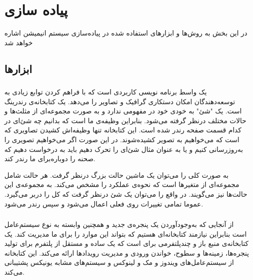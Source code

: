 \chapter { پیاده سازی }

در این بخش به روش‌ها و ابزارهای استفاده شده در پیاده‌سازی سیستم انیمیشن اشاره خواهد شد

\section {ابزارها}

\subsection {
    }

یک واسط برنامه نویسی کاربردی  
است که با فراهم کردن توابع زیادی به توسعه‌دهندگان امکان دستکاری گرافیک و تصاویر را می‌دهد.
یک کتابخانه‌ی رندرینگ است.
یک "شئ" به خودی خود در
مفهومی ندارد
و به صورت مجموعه‌ای از مثلث‌ها و حالات مختلف درنظر گرفته می‌شود. بنابراین  
وظیفه‌ی ما است که بدانیم چه شئ‌ای در کدام قسمت صفحه رندر شده است. این کتابخانه تنها وظیفه‌اش کشیدن تصاویری که است که می‌خواهیم به تصویر کشیده‌شوند.
در این صورت اگر می‌خواهیم تصویری را به‌روزرسانی کنیم و یا به عنوان مثال شئ‌ای را تحرک دهیم باید به 
درخواست دهیم که صحنه را دوباره‌برای ما رندر کند.
\cite{KhronosUsingOpenGL}

به صورت کلی 
را می‌توان یک ماشین حالت بزرگ درنظر گرفت. هر حالت شامل مجموعه‌ای از متغیر‌ها است که نحوه‌ی عملکرد
را مشخص می‌کند. 
به مجموعه‌ی این حالت‌ها 
نیز می‌گویند. 
در واقع  
را می‌توان یک شئ درنظر گرفت که کل
را دربر می‌گیرد. عموما تمامی تغییرات روی 
فعلی اعمال می‌شود و سپس رندر می‌شود.
\cite{KhronosUsingOpenGL} \cite{LearnOpenGL_GettingStarted}


\subsection{}

از آنجایی که به‌وجود‌آوردن یک پنجره‌ی جدید و همچنین 
وابسته به نوع سیستم‌عامل است بنابراین نیازمند کتابخانه‌ای هستیم که بتواند این موارد را برای ما مدیریت کند.
یک کتابخانه‌ی منبع باز و چندپلتفرمی برای 
است که یک
ساده و مستقل از پلتفرم برای تولید پنجره‌ها، زمینه‌‌ها
و سطوح، خواندن ورودی و مدیریت رویداد‌ها
ارائه می‌کند. 
این کتابخانه از سیستم‌عامل‌های 
ویندوز
و 
مک
و 
لینوکس
و سیستم‌های مشابه یونیکس پشتیبانی ‌می‌کند.
\cite{GLFW}


